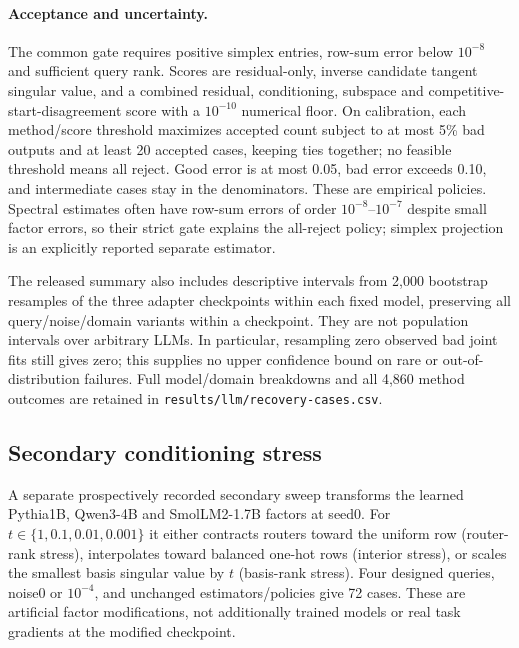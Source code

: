 \paragraph{Acceptance and uncertainty.}
The common gate requires positive simplex entries, row-sum error below
$10^{-8}$ and sufficient query rank. Scores are residual-only,
 inverse candidate tangent singular value, and a combined residual,
 conditioning, subspace and competitive-start-disagreement score with a
$10^{-10}$ numerical floor. On calibration, each method/score threshold
 maximizes accepted count subject to at most 5\% bad outputs and at least 20
 accepted cases, keeping ties together; no feasible threshold means all
 reject. Good error is at most 0.05, bad error exceeds 0.10, and intermediate
 cases stay in the denominators. These are empirical policies. Spectral
 estimates often have row-sum errors of order $10^{-8}$--$10^{-7}$ despite
 small factor errors, so their strict gate explains the all-reject policy;
 simplex projection is an explicitly reported separate estimator.



The released summary also includes descriptive intervals from 2,000
 bootstrap resamples of the three adapter checkpoints within each fixed
 model, preserving all query/noise/domain variants within a checkpoint.
They are not population intervals over arbitrary LLMs. In particular,
 resampling zero observed bad joint fits still gives zero; this supplies
 no upper confidence bound on rare or out-of-distribution failures.
Full model/domain breakdowns and all 4,860 method outcomes are retained in
\texttt{results/llm/recovery-cases.csv}.

\subsection{Secondary conditioning stress}

A separate prospectively recorded secondary sweep transforms the learned
Pythia1B, Qwen3-4B and SmolLM2-1.7B factors at seed0. For
$t\in\{1,0.1,0.01,0.001\}$ it either contracts routers toward the uniform
 row (router-rank stress), interpolates toward balanced one-hot rows
 (interior stress), or scales the smallest basis singular value by $t$
 (basis-rank stress). Four designed queries, noise0 or $10^{-4}$, and
 unchanged estimators/policies give 72 cases. These are artificial factor
 modifications, not additionally trained models or real task gradients at
 the modified checkpoint.

